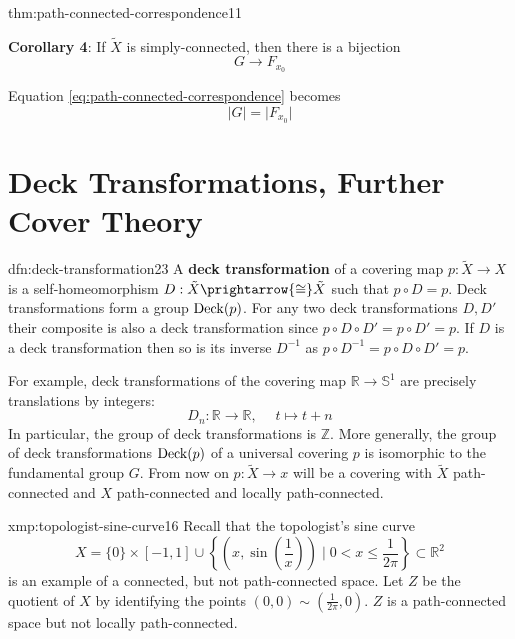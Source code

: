 \documentclass[landscape, 8pt]{extarticle}
\begin{document}
\begin{multicols*}{3}
\begin{thm}{thm:path-connected-correspondence}{11}
	\par\vspace{-5pt}
	\tcbline
	\textbf{Corollary 4}: If $\tilde{X}$ is simply-connected, then there is a bijection
	\vspace{-2pt}
	\[G \to F_{x_{0}}\]
	\par\vspace{-4pt}
	Equation \eqref{eq:path-connected-correspondence} becomes
	\vspace{-4pt}
	\begin{equation}\label{eq:simply-connected-correspondence}
		\lvert G \rvert = \lvert F_{x_{0}} \rvert
	\end{equation}
\end{thm}

\vspace{-12pt}
\section{Deck Transformations, Further Cover Theory}
\vspace{-3pt}
\begin{dfn}{dfn:deck-transformation}{23}
	\vspace{-2pt}
	A \textbf{deck transformation} of a covering map $p : \tilde{X} \to X$ is a self-homeomorphism $D : \tilde{X} \prightarrow{\cong} \tilde{X}$ such that $p \circ D = p$.
	\tcbline
	Deck transformations form a group $\operatorname{Deck}(p)$. For any two deck transformations $D, D'$ their composite is also a deck transformation since $p \circ D \circ D' = p \circ D' = p$. If $D$ is a deck transformation then so is its inverse $D^{-1}$ as $p \circ D^{-1} = p \circ D \circ D' = p$. 

	For example, deck transformations of the covering map $\mathbb{R} \to \mathbb{S}^{1}$ are precisely translations by integers:
	\[D_{n} : \mathbb{R} \to \mathbb{R},\;\quad t \mapsto t+n\]
	In particular, the group of deck transformations is $\mathbb{Z}$. More generally, the group of deck transformations $\operatorname{Deck}(p)$ of a universal covering $p$ is isomorphic to the fundamental group $G$. From now on $p : \tilde{X} \to x$ will be a covering with $\tilde{X}$ path-connected and $X$ path-connected and locally path-connected.
\end{dfn}

\begin{xmp}{xmp:topologist-sine-curve}{16}
	Recall that the topologist's sine curve
	\[X = \{0\} \times [-1, 1] \cup \left\{\left(x, \sin\left( \frac{1}{x}\right)\right) \mid 0 < x \le \frac{1}{2\pi}\right\} \subset \mathbb{R}^{2}\]
	is an example of a connected, but not path-connected space. Let $Z$ be the quotient of $X$ by identifying the points $(0, 0) \sim (\frac{1}{2\pi}, 0)$. $Z$ is a path-connected space but not locally path-connected.
\end{xmp}


\end{multicols*}
\end{document}
